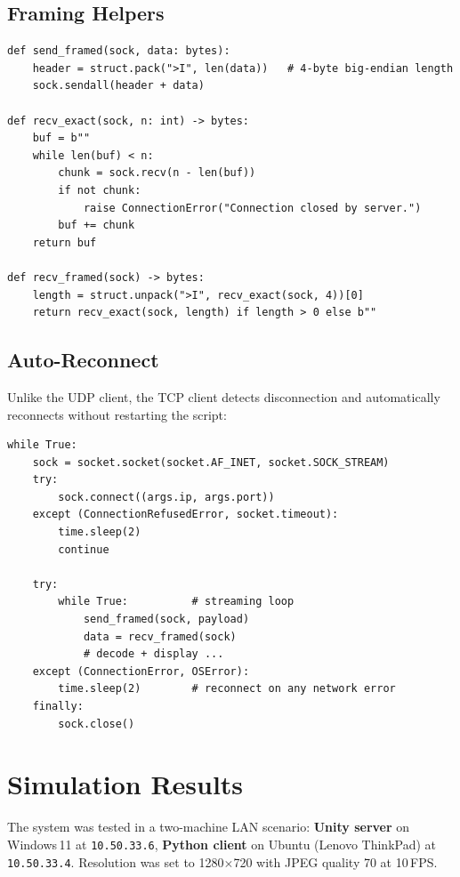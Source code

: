 \documentclass[12pt,a4paper]{article}
\begin{document}
\subsection{Framing Helpers}

\begin{lstlisting}[style=python, caption={Send and receive framed messages over TCP.}]
def send_framed(sock, data: bytes):
    header = struct.pack(">I", len(data))   # 4-byte big-endian length
    sock.sendall(header + data)

def recv_exact(sock, n: int) -> bytes:
    buf = b""
    while len(buf) < n:
        chunk = sock.recv(n - len(buf))
        if not chunk:
            raise ConnectionError("Connection closed by server.")
        buf += chunk
    return buf

def recv_framed(sock) -> bytes:
    length = struct.unpack(">I", recv_exact(sock, 4))[0]
    return recv_exact(sock, length) if length > 0 else b""
\end{lstlisting}

\subsection{Auto-Reconnect}

Unlike the UDP client, the TCP client detects disconnection and automatically
reconnects without restarting the script:

\begin{lstlisting}[style=python, caption={Outer reconnect loop wrapping the streaming loop.}]
while True:
    sock = socket.socket(socket.AF_INET, socket.SOCK_STREAM)
    try:
        sock.connect((args.ip, args.port))
    except (ConnectionRefusedError, socket.timeout):
        time.sleep(2)
        continue

    try:
        while True:          # streaming loop
            send_framed(sock, payload)
            data = recv_framed(sock)
            # decode + display ...
    except (ConnectionError, OSError):
        time.sleep(2)        # reconnect on any network error
    finally:
        sock.close()
\end{lstlisting}

\section{Simulation Results}

The system was tested in a two-machine LAN scenario:
\textbf{Unity server} on Windows\,11 at \texttt{10.50.33.6},
\textbf{Python client} on Ubuntu (Lenovo ThinkPad) at \texttt{10.50.33.4}.
Resolution was set to 1280$\times$720 with JPEG quality 70 at 10\,FPS.
\end{document}
